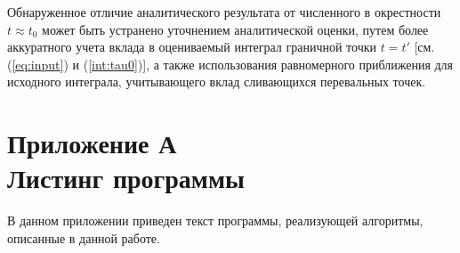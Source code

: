 \documentclass[14pt, a4paper]{article}
\numberwithin{figure}{section}
\numberwithin{equation}{section}
\begin{document}
Обнаруженное отличие аналитического результата от численного в окрестности $t\approx t_0$ может быть устранено уточнением аналитической оценки, путем более аккуратного учета вклада в оцениваемый интеграл граничной точки $t=t'$ [см. (\ref{eq:input}) и (\ref{int:tau0})], а также использования равномерного приближения для исходного интеграла, учитывающего вклад сливающихся перевальных точек.


\newpage
{}



\newpage
{}
\section*{Приложение А\\Листинг программы}\label{attachA}

В данном приложении приведен текст программы, реализующей алгоритмы, описанные в данной работе.


\end{document}
